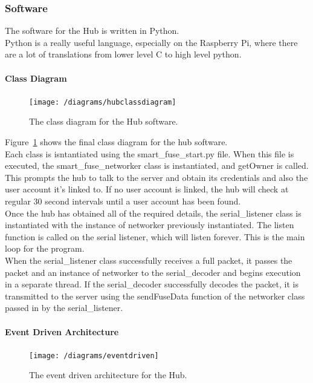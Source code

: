 \documentclass[preprint,12pt,3p]{elsarticle}
\begin{document}
\subsubsection{Software}
The software for the Hub is written in Python.\\
Python is a really useful language, especially on the Raspberry Pi, where there are a lot of translations from lower level C to high level python.\\

\paragraph{Class Diagram}
\begin{figure}[H]
    \centering
    \texttt{[image: /diagrams/hubclassdiagram]}
    \caption{The class diagram for the Hub software.}
    \label{fig:hubclassdiagram}
\end{figure}
Figure~\ref{fig:hubclassdiagram} shows the final class diagram for the hub software.\\
Each class is isntantiated using the smart\_fuse\_start.py file. When this file is executed, the smart\_fuse\_networker class is instantiated, and getOwner is called. This prompts the hub to talk to the server and obtain its credentials and also the user account it's linked to. If no user account is linked, the hub will check at regular 30 second intervals until a user account has been found.\\
Once the hub has obtained all of the required details, the serial\_listener class is instantiated with the instance of networker previously instantiated. The listen function is called on the serial listener, which will listen forever. This is the main loop for the program.\\
When the serial\_listener class successfully receives a full packet, it passes the packet and an instance of networker to the serial\_decoder and begins execution in a separate thread. If the serial\_decoder successfully decodes the packet, it is transmitted to the server using the sendFuseData function of the networker class passed in by the serial\_listener.
\paragraph{Event Driven Architecture}

\begin{figure}[H]
    \centering
    \texttt{[image: /diagrams/eventdriven]}
    \caption{The event driven architecture for the Hub.}
    \label{fig:eventdriven}
\end{figure}
\end{document}
